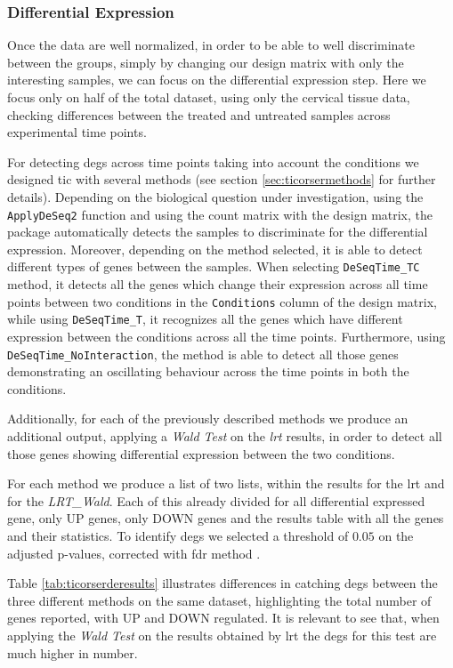 \subsubsection{Differential Expression}
Once the data are well normalized, in order to be able to well discriminate between the groups, simply by changing our design matrix with only the interesting samples, we can focus on the differential expression step.
Here we focus only on half of the total dataset, using only the cervical tissue data, checking differences between the treated and untreated samples across experimental time points.

For detecting \glspl{deg} across time points taking into account the conditions we designed \gls{tic} with several methods (see section \ref{sec:ticorsermethods} for further details).
Depending on the biological question under investigation, using the \lstinline!ApplyDeSeq2! function and using the count matrix with the design matrix, the package automatically detects the samples to discriminate for the differential expression.
Moreover, depending on the method selected, it is able to detect different types of genes between the samples.
When selecting \lstinline!DeSeqTime_TC! method, it detects all the genes which change their expression across all time points between two conditions in the \lstinline!Conditions! column of the design matrix, while using \lstinline!DeSeqTime_T!, it recognizes all the genes which have different expression between the conditions across all the time points. 
Furthermore, using \lstinline!DeSeqTime_NoInteraction!, the method is able to detect all those genes demonstrating an oscillating behaviour across the time points in both the conditions.

Additionally, for each of the previously described methods we produce an additional output, applying a \textit{Wald Test} on the \textit{lrt} results, in order to detect all those genes showing differential expression between the two conditions.

For each method we produce a list of two lists, within the results for the \gls{lrt} and for the \textit{LRT\_Wald}. Each of this already divided for all differential expressed gene, only UP genes, only DOWN genes and the results table with all the genes and their statistics.
To identify \glspl{deg} we selected a threshold of $0.05$ on the adjusted p-values, corrected with \gls{fdr} method \cite{Benjamini1995}.

Table \ref{tab:ticorserderesults} illustrates differences in catching \glspl{deg} between the three different methods on the same dataset, highlighting the total number of genes reported, with UP and DOWN regulated. 
It is relevant to see that, when applying the \textit{Wald Test} on the results obtained by \gls{lrt} the \glspl{deg} for this test are much higher in number.

